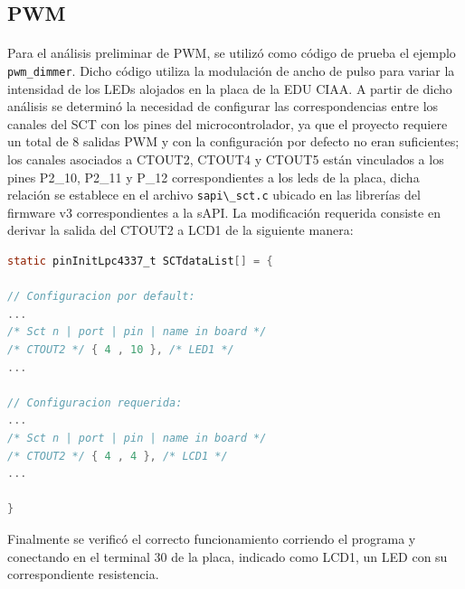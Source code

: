 \subsection{PWM}

\paragraph{} Para el análisis preliminar de PWM, se utilizó como código de prueba el ejemplo \verb|pwm_dimmer|. Dicho código utiliza la modulación de ancho de pulso para variar la intensidad de los LEDs alojados en la placa de la EDU CIAA.  A partir de dicho análisis se determinó la necesidad de configurar las correspondencias entre los canales del SCT con los pines del microcontrolador, ya que el proyecto requiere un total de 8 salidas PWM y con la configuración por defecto no eran suficientes; los canales asociados a  CTOUT2, CTOUT4 y CTOUT5 están vinculados a los pines P2\_10, P2\_11 y P\_12 correspondientes a los leds de la placa, dicha relación se establece en el archivo \verb|sapi\_sct.c| ubicado en las librerías del firmware v3 correspondientes a la sAPI. La modificación requerida consiste en derivar la salida del CTOUT2 a LCD1 de la siguiente manera:

\begin{lstlisting}[language=c,basicstyle=\footnotesize\ttfamily]
static pinInitLpc4337_t SCTdataList[] = {

// Configuracion por default:
...
/* Sct n | port | pin | name in board */
/* CTOUT2 */ { 4 , 10 }, /* LED1 */
...

// Configuracion requerida:
...
/* Sct n | port | pin | name in board */
/* CTOUT2 */ { 4 , 4 }, /* LCD1 */
...

}
\end{lstlisting}

Finalmente se verificó el correcto funcionamiento corriendo el programa y conectando en el terminal 30 de la placa, indicado como LCD1, un LED con su correspondiente resistencia.
